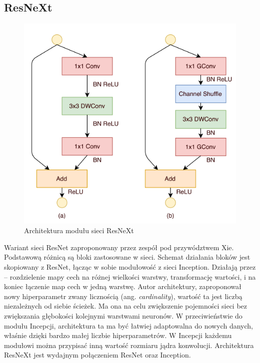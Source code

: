 \documentclass[12pt,a4paper,twoside,titlepage,openright]{book}
\begin{document}
\begin{itemize}
\begin{itemize}
\section{ResNeXt}
\begin{figure}[h]
	\centering
			\includegraphics[resolution=100, scale=0.9]{ResNeXt.png}
		\caption{Architektura modułu sieci ResNeXt}
\end{figure}
Wariant sieci ResNet zaproponowany przez zespół pod przywództwem Xie. Podstawową różnicą są bloki zastosowane w sieci. Schemat działania bloków jest skopiowany z ResNet, łącząc w sobie modułowość z sieci Inception. Działają przez -- rozdzielenie mapy cech na różnej wielkości warstwy, transformację wartości, i na koniec łączenie map cech w jedną warstwę. Autor architektury, zaproponował nowy hiperparametr zwany licznością (ang. \textit{cardinality}), wartość ta jest liczbą niezależnych od siebie ścieżek. Ma ona na celu zwiększenie pojemności sieci bez zwiększania głębokości kolejnymi warstwami neuronów. W przeciwieństwie do modułu Incepcji, architektura ta ma być łatwiej adaptowalna do nowych danych, właśnie dzięki bardzo małej liczbie hiperparametrów. W Incepcji każdemu modułowi można przypisać inną wartość rozmiaru jądra konwolucji. Architektura ResNeXt jest wydajnym połączeniem ResNet oraz Inception. \cite{DBLP:journals/corr/XieGDTH16}


\end{itemize}
\end{itemize}
\end{document}
